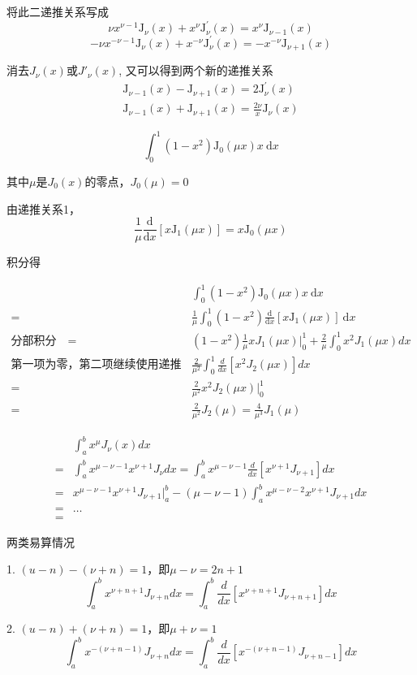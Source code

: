 将此二递推关系写成
$$\nu x^{\nu-1}\mathrm{J}_\nu(x)+x^\nu\mathrm{J}_\nu^{\prime}(x)=x^\nu\mathrm{J}_{\nu-1}(x)$$
$$-\nu x^{-\nu-1}\mathrm{J}_\nu(x)+x^{-\nu}\mathrm{J}_\nu^{\prime}(x)=-x^{-\nu}\mathrm{J}_{\nu+1}(x)$$

消去$J_\nu(x)$或$J′_\nu(x)$, 又可以得到两个新的递推关系
$$\boxed{
    \begin{array}{c}
        \mathrm{J}_{\nu-1}(x)-\mathrm{J}_{\nu+1}(x)=2\mathrm{J}_\nu^{\prime}(x)\\
        \mathrm{J}_{\nu-1}(x)+\mathrm{J}_{\nu+1}(x)=\frac{2\nu}x\mathrm{J}_\nu(x)
    \end{array}}
    $$
\begin{ex}
    $$\int_0^1\left(1-x^2\right)\mathrm{J}_0(\mu x)x\mathrm{~d}x$$

    其中$\mu$是$J_0(x)$的零点，$J_0(\mu)=0$

由递推关系1，
$$
\frac1\mu\frac{\mathrm{d}}{\mathrm{d}x}\left[x\mathrm{J}_1(\mu x)\right]=x\mathrm{J}_{0}(\mu x)
$$

积分得

$$\begin{aligned}
&\int_0^1\left(1-x^2\right)\mathrm{J}_0(\mu x)x\mathrm{~d}x\\
=&\frac1\mu\int_0^1(1-x^2)\frac{\mathrm{d}}{\mathrm{d}x}\left[x\mathrm{J}_1(\mu x)\right]\mathrm{~d}x\\
\mbox{分部积分}\quad=&(1-x^2)\frac{1}{\mu}xJ_1(\mu x)\bigg|_0^1+\frac{2}{\mu}\int_0^1x^2J_1(\mu x)dx\\
\mbox{第一项为零，第二项继续使用递推关系1}\quad=&\frac{2}{\mu^2}\int_{0}^{1}\frac{d}{dx}[x^2J_2(\mu x)]dx\\
=&\frac{2}{\mu^2}x^2J_2(\mu x)\bigg|_0^1\\
=&\frac{2}{\mu^2}J_2(\mu)=\frac{4}{\mu^3}J_1(\mu)
\end{aligned}$$
\end{ex}

\begin{app}[幂函数乘Bessel函数积分]
    $$\begin{aligned}
    &\int_{a}^{b}x^{\mu}J_{\nu}(x)dx\\
    =&\int_{a}^{b}x^{\mu-\nu-1}x^{\nu+1}J_{\nu}dx=\int_{a}^{b}x^{\mu-\nu-1}\frac{d}{dx}[x^{\nu+1}J_{\nu+1}]dx\\
    =&x^{\mu-\nu-1}x^{\nu+1}J_{\nu+1}\bigg|_{a}^{b}-(\mu-\nu-1)\int_{a}^{b}x^{\mu-\nu-2}x^{\nu+1}J_{\nu+1}dx\\
    =&\dots\\
    =&
    \end{aligned}$$

两类易算情况

1. $(u-n)-(\nu+n)=1$，即$\mu-\nu=2n+1$ 
$$\int_{a}^{b}x^{\nu+n+1}J_{\nu+n}dx=\int_{a}^{b}\frac{d}{dx}[x^{\nu+n+1}J_{\nu+n+1}]dx$$

2. $(u-n)+(\nu+n)=1$，即$\mu+\nu=1$ 
$$\int_{a}^{b}x^{-(\nu+n-1)}J_{\nu+n}dx=\int_{a}^{b}\frac{d}{dx}[x^{-(\nu+n-1)}J_{\nu+n-1}]dx $$
\end{app}

